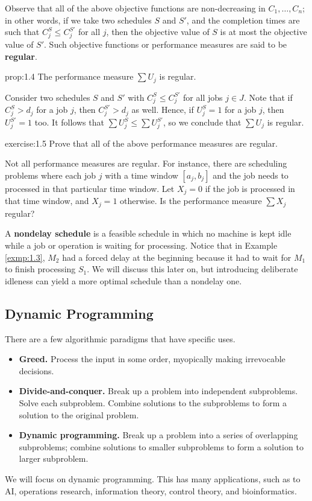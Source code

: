 Observe that all of the above objective functions are non-decreasing in 
$C_1, \dots, C_n$; in other words, if we take two schedules $S$ and $S'$, 
and the completion times are such that $C_j^S \leq C_j^{S'}$ for all 
$j$, then the objective value of $S$ is at most the objective value of $S'$. 
Such objective functions or performance measures are said to be {\bf regular}.

\begin{prop}{prop:1.4}
    The performance measure $\sum U_j$ is regular. 
\end{prop}
\begin{pf}
    Consider two schedules $S$ and $S'$ with $C_j^S \leq C_j^{S'}$ for all 
    jobs $j \in J$. Note that if $C_j^S > d_j$ for a job $j$, then 
    $C_j^{S'} > d_j$ as well. Hence, if $U_j^S = 1$ for a job $j$, then 
    $U_j^{S'} = 1$ too. It follows that $\sum U_j^S \leq \sum U_j^{S'}$, 
    so we conclude that $\sum U_j$ is regular. 
\end{pf}

\begin{exercise}{exercise:1.5}
    Prove that all of the above performance measures are regular.
\end{exercise}

Not all performance measures are regular. For instance, there are scheduling 
problems where each job $j$ with a time window $[a_j, b_j]$ and the 
job needs to processed in that particular time window. Let $X_j = 0$ if the 
job is processed in that time window, and $X_j = 1$ otherwise. 
Is the performance measure $\sum X_j$ regular?

A {\bf nondelay schedule} is a feasible schedule in which no machine is kept 
idle while a job or operation is waiting for processing. Notice that in 
Example \ref{exmp:1.3}, $M_2$ had a forced delay at the beginning because 
it had to wait for $M_1$ to finish processing $S_1$. We will discuss this 
later on, but introducing deliberate idleness can yield a more optimal 
schedule than a nondelay one. 

\subsection{Dynamic Programming}\label{subsec:1.3}
There are a few algorithmic paradigms that have specific uses.
\begin{itemize}
    \item {\bf Greed.} Process the input in some order, myopically making 
    irrevocable decisions.
    \item {\bf Divide-and-conquer.} Break up a problem into independent 
    subproblems. Solve each subproblem. Combine solutions to the subproblems to 
    form a solution to the original problem.
    \item {\bf Dynamic programming.} Break up a problem into a series of 
    overlapping subproblems; combine solutions to smaller subproblems to 
    form a solution to larger subproblem.
\end{itemize}
We will focus on dynamic programming. This has many applications, such as 
to AI, operations research, information theory, control theory, and 
bioinformatics. 

